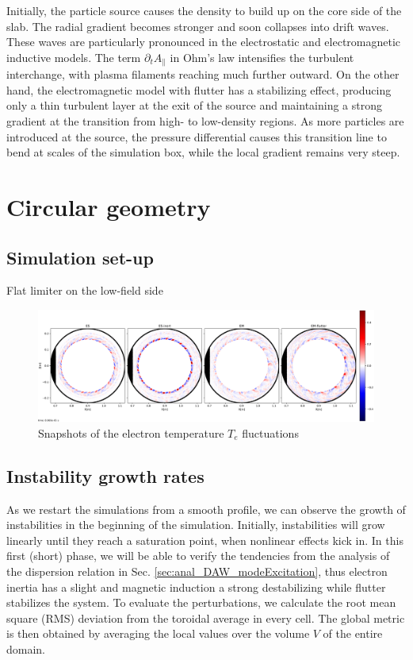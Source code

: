 Initially, the particle source causes the density to build up on the core side of the slab. The radial gradient becomes stronger and soon collapses into drift waves. These waves are particularly pronounced in the electrostatic and electromagnetic inductive models. The term $\partial_t A_\parallel$ in Ohm's law intensifies the turbulent interchange, with plasma filaments reaching much further outward. On the other hand, the electromagnetic model with flutter has a stabilizing effect, producing only a thin turbulent layer at the exit of the source and maintaining a strong gradient at the transition from high- to low-density regions. As more particles are introduced at the source, the pressure differential causes this transition line to bend at scales of the simulation box, while the local gradient remains very steep. \newline

\section{Circular geometry}

\subsection{Simulation set-up}

Flat limiter on the low-field side


\begin{figure}[H]\centering
	\centering
	\includegraphics[width=1\textwidth]{schemes/CIRC_fluctT.jpg}
	\caption{Snapshots of the electron temperature $T_e$ fluctuations}
	\label{fig:CIRC_fluctPHI}
\end{figure}


\subsection{Instability growth rates}

As we restart the simulations from a smooth profile, we can observe the growth of instabilities in the beginning of the simulation. Initially, instabilities will grow linearly until they reach a saturation point, when nonlinear effects kick in. In this first (short) phase, we will be able to verify the tendencies from the analysis of the dispersion relation in Sec. \ref{sec:anal_DAW_modeExcitation}, thus electron inertia has a slight and magnetic induction a strong destabilizing while flutter stabilizes the system. To evaluate the perturbations, we calculate the root mean square (RMS) deviation from the toroidal average in every cell. The global metric is then obtained by averaging the local values over the volume $V$ of the entire domain. 

